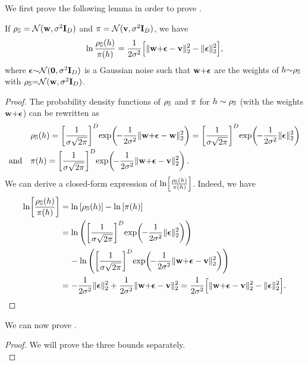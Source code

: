 \begin{noaddcontents}
We first prove the following lemma in order to prove .
\begin{lemma}
If $\AQ=\Ncal(\wbf, \sigma^2\Ibf_D)$ and $\P = \Ncal(\vbf, \sigma^2\Ibf_{D})$, we have 
\begin{align*}
    \ln\frac{\AQ(\h)}{\P(\h)} = \frac{1}{2\sigma^2}\Big[\|\wbf{+}\epsilonbf-\vbf\|_2^2-\|\epsilonbf\|_2^2\Big],
\end{align*}
where $\epsilonbf{\sim}\Ncal(\zerobf, \sigma^2\Ibf_{D})$ is a Gaussian noise 
such that  $\wbf{+}\epsilonbf$ are the weights of $\h{\sim}\AQ$ with \mbox{$\AQ{=}\Ncal(\wbf, \sigma^2\Ibf_{D})$}.
\label{chap:dis-pra:lemma:disintegrated-kl}
\end{lemma}
\begin{proof}
The probability density functions of $\AQ$ and $\P$ for $\h\sim\AQ$ (with the weights $\wbf{+}\epsilonbf$) can be rewritten as
\begin{align*}
    &\AQ(\h) = \LB\frac{1}{\sigma\sqrt{2\pi}}\RB^D\!\exp\!\LP\!-\frac{1}{2\sigma^2}\|\wbf{+}\epsilonbf-\wbf\|_2^2\RP = \LB\frac{1}{\sigma\sqrt{2\pi}}\RB^D\!\exp\!\LP\!-\frac{1}{2\sigma^2}\|\epsilonbf\|_2^2\RP\\
    \text{and}\quad &\P(\h)=\LB\frac{1}{\sigma\sqrt{2\pi}}\RB^D\!\exp\!\LP\!-\frac{1}{2\sigma^2}\|\wbf{+}\epsilonbf-\vbf\|_2^2\RP.
\end{align*}
We can derive a closed-form expression of $\ln\!\LB\frac{\AQ(\h)}{\P(\h)}\RB$. 
Indeed, we have
\begin{align*}
    \ln\!\LB\frac{\AQ(\h)}{\P(\h)}\RB &= \ln\LB\AQ(\h)\RB-\ln\LB\P(\h)\RB\\
    &= \ln\LP\LB\frac{1}{\sigma\sqrt{2\pi}}\RB^D\!\exp\!\LP\!-\frac{1}{2\sigma^2}\|\epsilonbf\|_2^2\RP\RP\\
    &\hspace{0.4cm}-\ln\LP\LB\frac{1}{\sigma\sqrt{2\pi}}\RB^D\!\exp\!\LP\!-\frac{1}{2\sigma^2}\|\wbf{+}\epsilonbf-\vbf\|_2^2\RP\RP\\
    &= -\frac{1}{2\sigma^2}\|\epsilonbf\|_2^2 + \frac{1}{2\sigma^2}\|\wbf{+}\epsilonbf-\vbf\|_2^2= \frac{1}{2\sigma^2}\Big[\|\wbf{+}\epsilonbf-\vbf\|_2^2-\|\epsilonbf\|_2^2\Big].
\end{align*}
\end{proof}

We can now prove .

\corollarynnrbc*
\begin{proof}
We will prove the three bounds separately.\\


\end{proof}
\end{noaddcontents}

